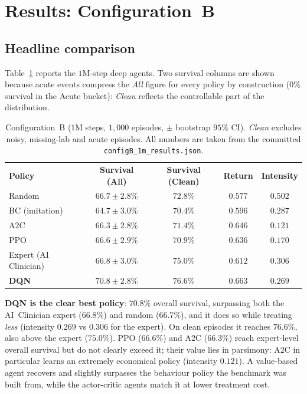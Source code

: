 \documentclass[11pt,a4paper]{article}
\newcommand{\tH}[1]{\textcolor{novagreen}{\textbf{#1}}}
\newcommand{\gmid}{\arrayrulecolor{novagreen}\midrule\arrayrulecolor{black}}
\begin{document}
\section{Results: Configuration~B}
\label{sec:resB}

\subsection{Headline comparison}

Table~\ref{tab:configB} reports the $1$M-step deep agents. Two survival columns
are shown because acute events compress the \emph{All} figure for every policy by
construction ($0\%$ survival in the Acute bucket): \emph{Clean} reflects the
controllable part of the distribution.

\begin{table}[H]
\centering
\begin{tabular}{lcccc}
\toprule
\tH{Policy} & \tH{Survival (All)} & \tH{Survival (Clean)} & \tH{Return} & \tH{Intensity} \\
\gmid
Random                    & $66.7\pm2.8\%$ & $72.8\%$ & $0.577$ & $0.502$ \\
BC (imitation)            & $64.7\pm3.0\%$ & $70.4\%$ & $0.596$ & $0.287$ \\
A2C                       & $66.3\pm2.8\%$ & $71.4\%$ & $0.646$ & $\mathbf{0.121}$ \\
PPO                       & $66.6\pm2.9\%$ & $70.9\%$ & $0.636$ & $0.170$ \\
Expert (AI Clinician)     & $66.8\pm3.0\%$ & $75.0\%$ & $0.612$ & $0.306$ \\
\textbf{DQN}              & $\mathbf{70.8\pm2.8\%}$ & $\mathbf{76.6\%}$ & $\mathbf{0.663}$ & $0.269$ \\
\bottomrule
\end{tabular}
\caption{Configuration~B ($1$M steps, $1{,}000$ episodes, $\pm$ bootstrap $95\%$ CI).
\emph{Clean} excludes noisy, missing-lab and acute episodes. All numbers are taken
from the committed \texttt{configB\_1m\_results.json}.}
\label{tab:configB}
\end{table}

\textbf{DQN is the clear best policy}: $70.8\%$ overall survival, surpassing both
the AI~Clinician expert ($66.8\%$) and random ($66.7\%$), and it does so while
treating \emph{less} (intensity $0.269$ vs $0.306$ for the expert). On clean
episodes it reaches $76.6\%$, also above the expert ($75.0\%$). PPO ($66.6\%$) and
A2C ($66.3\%$) reach expert-level overall survival but do not clearly exceed it;
their value lies in parsimony: A2C in particular learns an extremely economical
policy (intensity $0.121$). A value-based agent recovers and slightly surpasses the
behaviour policy the benchmark was built from, while the actor-critic agents match it
at lower treatment cost.
\end{document}
